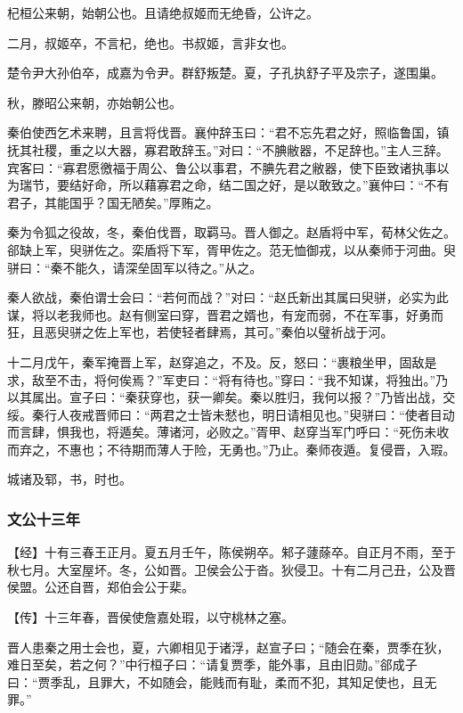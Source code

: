 \documentclass[]{article}
\begin{document}
杞桓公来朝，始朝公也。且请绝叔姬而无绝昏，公许之。

二月，叔姬卒，不言杞，绝也。书叔姬，言非女也。

楚令尹大孙伯卒，成嘉为令尹。群舒叛楚。夏，子孔执舒子平及宗子，遂围巢。

秋，滕昭公来朝，亦始朝公也。

秦伯使西乞术来聘，且言将伐晋。襄仲辞玉曰：``君不忘先君之好，照临鲁国，镇抚其社稷，重之以大器，寡君敢辞玉。''对曰：``不腆敝器，不足辞也。''主人三辞。宾客曰：``寡君愿徼福于周公、鲁公以事君，不腆先君之敝器，使下臣致诸执事以为瑞节，要结好命，所以藉寡君之命，结二国之好，是以敢致之。''襄仲曰：``不有君子，其能国乎？国无陋矣。''厚贿之。

秦为令狐之役故，冬，秦伯伐晋，取羁马。晋人御之。赵盾将中军，荀林父佐之。郤缺上军，臾骈佐之。栾盾将下军，胥甲佐之。范无恤御戎，以从秦师于河曲。臾骈曰：``秦不能久，请深垒固军以待之。''从之。

秦人欲战，秦伯谓士会曰：``若何而战？''对曰：``赵氏新出其属曰臾骈，必实为此谋，将以老我师也。赵有侧室曰穿，晋君之婿也，有宠而弱，不在军事，好勇而狂，且恶臾骈之佐上军也，若使轻者肆焉，其可。''秦伯以璧祈战于河。

十二月戊午，秦军掩晋上军，赵穿追之，不及。反，怒曰：``裹粮坐甲，固敌是求，敌至不击，将何俟焉？''军吏曰：``将有待也。''穿曰：``我不知谋，将独出。''乃以其属出。宣子曰：``秦获穿也，获一卿矣。秦以胜归，我何以报？''乃皆出战，交绥。秦行人夜戒晋师曰：``两君之士皆未憖也，明日请相见也。''臾骈曰：``使者目动而言肆，惧我也，将遁矣。薄诸河，必败之。''胥甲、赵穿当军门呼曰：``死伤未收而弃之，不惠也；不待期而薄人于险，无勇也。''乃止。秦师夜遁。复侵晋，入瑕。

城诸及郓，书，时也。

\hypertarget{header-n1198}{%
\subsubsection{文公十三年}\label{header-n1198}}

【经】十有三春王正月。夏五月壬午，陈侯朔卒。邾子蘧蒢卒。自正月不雨，至于秋七月。大室屋坏。冬，公如晋。卫侯会公于沓。狄侵卫。十有二月己丑，公及晋侯盟。公还自晋，郑伯会公于棐。

【传】十三年春，晋侯使詹嘉处瑕，以守桃林之塞。

晋人患秦之用士会也，夏，六卿相见于诸浮，赵宣子曰；``随会在秦，贾季在狄，难日至矣，若之何？''中行桓子曰：``请复贾季，能外事，且由旧勋。''郤成子曰：``贾季乱，且罪大，不如随会，能贱而有耻，柔而不犯，其知足使也，且无罪。''
\end{document}

